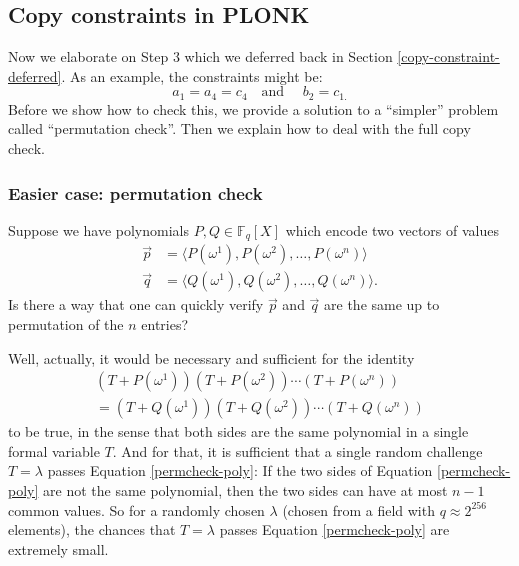 \subsection{Copy constraints in PLONK}
\label{copy-constraints}

Now we elaborate on Step 3 which we deferred back in
Section \ref{copy-constraint-deferred}. As an example, the constraints might be:
\[a_{1} = a_{4} = c_{4}\quad\text{and }\quad b_{2} = c_{1.}\] Before we
show how to check this, we provide a solution to a ``simpler'' problem
called ``permutation check''. Then we explain how to deal with the full
copy check.

\subsubsection{Easier case: permutation check}

\begin{problem}
Suppose we have polynomials \(P,Q \in {\mathbb{F}}_{q}[ X]\)
which encode two vectors of values \[\begin{aligned}
\overset{\rightarrow}{p} & = \langle P( \omega^{1} ),P( \omega^{2} ),\ldots,P( \omega^{n} )\rangle \\
\overset{\rightarrow}{q} & = \langle Q( \omega^{1} ),Q( \omega^{2} ),\ldots,Q( \omega^{n} )\rangle.
\end{aligned}\] Is there a way that one can quickly verify
\(\overset{\rightarrow}{p}\) and \(\overset{\rightarrow}{q}\) are the
same up to permutation of the \(n\) entries?
\end{problem}


Well, actually, it would be necessary and sufficient for the identity
\begin{eqnarray}
\label{permcheck-poly}
( T + P( \omega^{1} ) )( T + P( \omega^{2} ) )\cdots( T + P( \omega^{n} ) ) \nonumber \\
 = ( T + Q( \omega^{1} ) )( T + Q( \omega^{2} ) )\cdots( T + Q( \omega^{n} ) )
\end{eqnarray}
to be true, in the sense that both sides are the same polynomial in a
single formal variable \(T\). And for that, it is sufficient that a
single random challenge \(T = \lambda\) passes
Equation \ref{permcheck-poly}: If the two sides of
Equation \ref{permcheck-poly} are not the same
polynomial, then the two sides can have at most \(n - 1\) common values.
So for a randomly chosen \(\lambda\) (chosen from a field with
\(q \approx 2^{256}\) elements), the chances that \(T = \lambda\) passes
Equation \ref{permcheck-poly} are extremely small.

